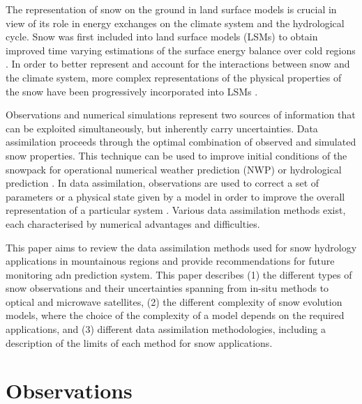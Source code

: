 \documentclass[utf8]{frontiersSCNS} %
\begin{document}
The representation of snow on the ground in land surface models is crucial in view of its role in energy exchanges on the climate system and the hydrological cycle. Snow was first included into land surface models (LSMs) to obtain improved time varying estimations of the surface energy balance over cold regions \citep{Loth_1993,Lynch_1994,Douville_1995,Yang_1998,Slater_1998}. In order to better represent and account for the interactions between snow and the climate system, more complex representations of the physical properties of the snow have been progressively incorporated into LSMs \citep{Boone_2001,Dutra_2010,Decharme_2016}. %

Observations and numerical simulations represent two sources of information that can be exploited simultaneously, but inherently carry uncertainties. Data assimilation proceeds through the optimal combination of observed and simulated snow properties. This technique can be used to improve initial conditions of the snowpack for operational numerical weather prediction (NWP) or hydrological prediction \citep{Brasnett_1999,Lehning_1999,Barret_2003,Drusch_2004}. In data assimilation, observations are used to correct a set of parameters or a physical state given by a model in order to improve the overall representation of a particular system \citep{Andreadis_2006,Clark_2006,Leisenring_2011,Nagler_2008,Liu_2013}. Various data assimilation methods exist, each characterised by numerical advantages and difficulties. 

This paper aims %
to review the data assimilation methods used for
snow hydrology applications in mountainous regions and provide recommendations for future monitoring adn prediction system. This paper describes (1) the different types of snow observations and their uncertainties spanning from in-situ methods to optical and microwave satellites, (2) the different complexity of snow evolution models, where the choice of the complexity of a model depends on the required applications, and  (3) different data assimilation methodologies, including a description of the limits of each method for snow applications. %


\section{Observations}
\end{document}
